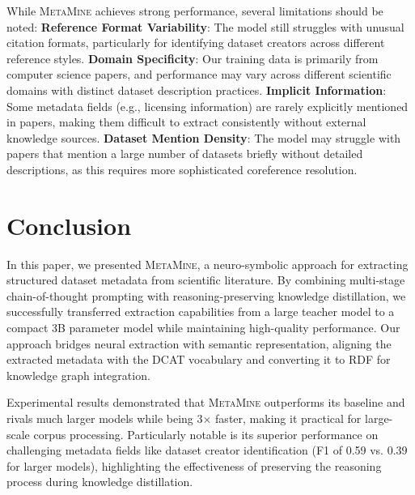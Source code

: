 \documentclass[runningheads]{llncs}
\begin{document}
While \textsc{MetaMine} achieves strong performance, several limitations should be noted:
     \textbf{Reference Format Variability}: The model still struggles with unusual citation formats, particularly for identifying dataset creators across different reference styles.
     \textbf{Domain Specificity}: Our training data is primarily from computer science papers, and performance may vary across different scientific domains with distinct dataset description practices.
     \textbf{Implicit Information}: Some metadata fields (e.g., licensing information) are rarely explicitly mentioned in papers, making them difficult to extract consistently without external knowledge sources.
     \textbf{Dataset Mention Density}: The model may struggle with papers that mention a large number of datasets briefly without detailed descriptions, as this requires more sophisticated coreference resolution.




\section{Conclusion}
\label{sec:conclusion}

In this paper, we presented \textsc{MetaMine}, a neuro-symbolic approach for extracting structured dataset metadata from scientific literature. By combining multi-stage chain-of-thought prompting with reasoning-preserving knowledge distillation, we successfully transferred extraction capabilities from a large teacher model to a compact 3B parameter model while maintaining high-quality performance. Our approach bridges neural extraction with semantic representation, aligning the extracted metadata with the DCAT vocabulary and converting it to RDF for knowledge graph integration.

Experimental results demonstrated that \textsc{MetaMine} outperforms its baseline and rivals much larger models while being 3× faster, making it practical for large-scale corpus processing. Particularly notable is its superior performance on challenging metadata fields like dataset creator identification (F1 of 0.59 vs. 0.39 for larger models), highlighting the effectiveness of preserving the reasoning process during knowledge distillation.
\end{document}
